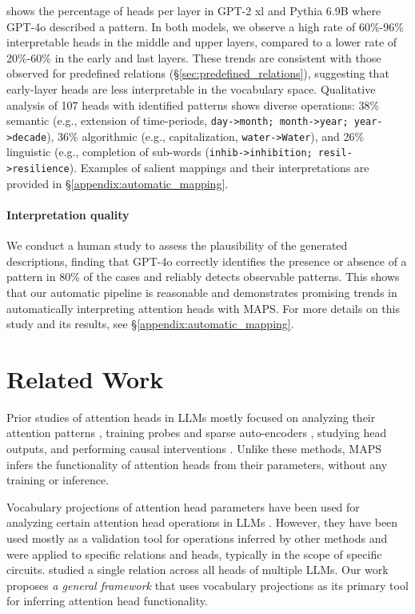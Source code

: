 \documentclass[11pt]{article}
\newcommand{\PythiaSevenB}{Pythia 6.9B}
\newcommand{\GPTxl}{GPT-2 xl}
\newcommand{\GPTFourO}{GPT-4o}
\newcommand{\framework}{\textsc{MAPS}}
\begin{document}
 shows the percentage of heads per layer in {\GPTxl} and {\PythiaSevenB} where \GPTFourO{} described a pattern. In both models, we observe a high rate of 60\%-96\% interpretable heads in the middle and upper layers, compared to a lower rate of 20\%-60\% in the early and last layers. These trends are consistent with those observed for predefined relations (\S\ref{sec:predefined_relations}), suggesting that early-layer heads are less interpretable in the vocabulary space. 
Qualitative analysis of 107 heads with identified patterns shows diverse operations: 38\% semantic (e.g., extension of time-periods, \texttt{day->month; month->year; year->decade}), 36\% algorithmic (e.g., capitalization, \texttt{water->Water}), and 26\% linguistic (e.g., completion of sub-words (\texttt{inhib->inhibition; resil->resilience}).
Examples of salient mappings and their interpretations are provided in \S\ref{appendix:automatic_mapping}.



\paragraph{Interpretation quality}
We conduct a human study to assess the plausibility of the generated descriptions, finding that \GPTFourO{} correctly identifies the presence or absence of a pattern in 80\% of the cases and reliably detects observable patterns. 
This shows that our automatic pipeline is reasonable and demonstrates promising trends in automatically interpreting attention heads with \framework{}.
For more details on this study and its results, see \S\ref{appendix:automatic_mapping}.



\section{Related Work}

Prior studies of attention heads in LLMs mostly focused on analyzing their attention patterns 
\citet{voita2019analyzing, clark-etal-2019-bert, vig-belinkov-2019-analyzing}, training probes and sparse auto-encoders \cite{kissane2024interpreting}, studying head outputs, and performing causal interventions \citep[see survey by][]{zheng2024attention}.
Unlike these methods, \framework{} infers the functionality of attention heads from their parameters, without any training or inference.

Vocabulary projections of attention head parameters have been used for analyzing certain attention head operations in LLMs
\cite{wang2022interpretability, mcdougall-etal-2024-copy, kim2024mechanistic, garcia2024does, elhage2021mathematical}. 
However, they have been used mostly as a validation tool for operations inferred by other methods and were applied to specific relations and heads, typically in the scope of specific circuits. 
\citet{gould2024successor} studied a single relation across all heads of multiple LLMs. Our work proposes \textit{a general framework} that uses vocabulary projections as its primary tool for inferring attention head functionality.
\end{document}
